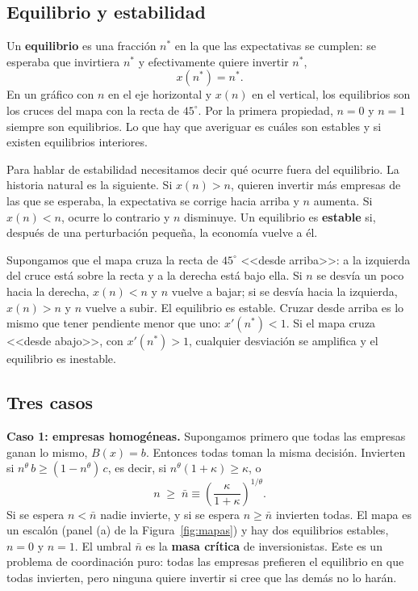 \documentclass[12pt,letterpaper]{article}
\begin{document}
\subsection{Equilibrio y estabilidad}

Un \textbf{equilibrio} es una fracción $n^*$ en la que las expectativas se cumplen: se esperaba que invirtiera $n^*$ y efectivamente quiere invertir $n^*$,
\[
  x(n^*)=n^* .
\]
En un gráfico con $n$ en el eje horizontal y $x(n)$ en el vertical, los equilibrios son los cruces del mapa con la recta de $45^{\circ}$. Por la primera propiedad, $n=0$ y $n=1$ siempre son equilibrios. Lo que hay que averiguar es cuáles son estables y si existen equilibrios interiores.

Para hablar de estabilidad necesitamos decir qué ocurre fuera del equilibrio. La historia natural es la siguiente. Si $x(n)>n$, quieren invertir más empresas de las que se esperaba, la expectativa se corrige hacia arriba y $n$ aumenta. Si $x(n)<n$, ocurre lo contrario y $n$ disminuye. Un equilibrio es \textbf{estable} si, después de una perturbación pequeña, la economía vuelve a él.

\begin{intuicion}
Supongamos que el mapa cruza la recta de $45^{\circ}$ <<desde arriba>>: a la izquierda del cruce está sobre la recta y a la derecha está bajo ella. Si $n$ se desvía un poco hacia la derecha, $x(n)<n$ y $n$ vuelve a bajar; si se desvía hacia la izquierda, $x(n)>n$ y $n$ vuelve a subir. El equilibrio es estable. Cruzar desde arriba es lo mismo que tener pendiente menor que uno: $x'(n^*)<1$. Si el mapa cruza <<desde abajo>>, con $x'(n^*)>1$, cualquier desviación se amplifica y el equilibrio es inestable.
\end{intuicion}

\subsection{Tres casos}

\textbf{Caso 1: empresas homogéneas.} Supongamos primero que todas las empresas ganan lo mismo, $B(x)=b$. Entonces todas toman la misma decisión. Invierten si $n^{\theta}\,b\geq(1-n^{\theta})\,c$, es decir, si $n^{\theta}(1+\kappa)\geq\kappa$, o
\[
  n\;\geq\;\bar n\equiv\left(\frac{\kappa}{1+\kappa}\right)^{1/\theta}.
\]
Si se espera $n<\bar n$ nadie invierte, y si se espera $n\geq\bar n$ invierten todas. El mapa es un escalón (panel (a) de la Figura~\ref{fig:mapas}) y hay dos equilibrios estables, $n=0$ y $n=1$. El umbral $\bar n$ es la \textbf{masa crítica} de inversionistas. Este es un problema de coordinación puro: todas las empresas prefieren el equilibrio en que todas invierten, pero ninguna quiere invertir si cree que las demás no lo harán.
\end{document}
